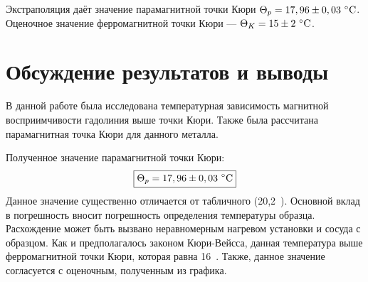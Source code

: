 \documentclass[a4paper, 12pt]{article}
\begin{document}
Экстраполяция даёт значение парамагнитной точки Кюри $\Theta_p = 17,96\pm0,03~\celsius$. Оценочное значение ферромагнитной точки Кюри --- $\Theta_K = 15\pm2~\celsius$.


\section{Обсуждение результатов и выводы}

В данной работе была исследована температурная зависимость магнитной восприимчивости гадолиния выше точки Кюри. Также была рассчитана парамагнитная точка Кюри для данного металла.

Полученное значение парамагнитной точки Кюри: $$\boxed{\Theta_p = 17,96\pm0,03~\celsius}$$
Данное значение существенно отличается от табличного (20,2~\textcelsius). Основной вклад в погрешность вносит погрешность определения температуры образца. Расхождение может быть вызвано неравномерным нагревом установки и сосуда с образцом. Как и предполагалось законом Кюри-Вейсса, данная температура выше ферромагнитной точки Кюри, которая равна 16~\textcelsius{}. Также, данное значение согласуется с оценочным, полученным из графика.
\end{document}
